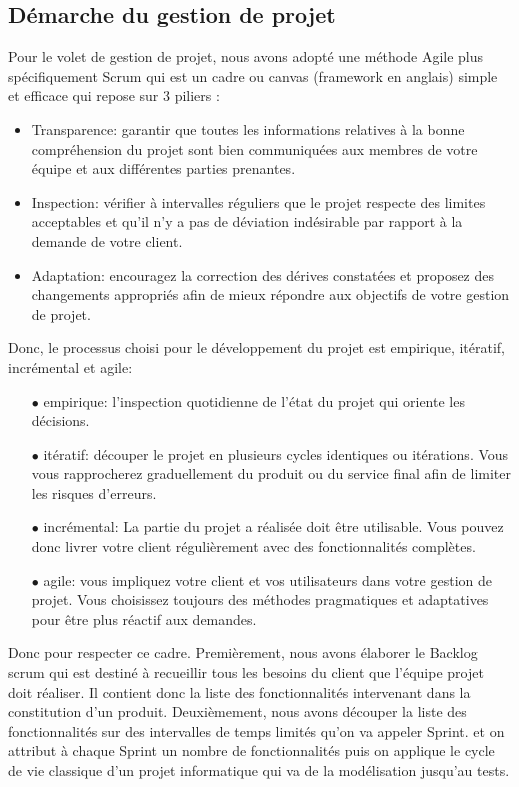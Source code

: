 \subsection{Démarche du gestion de projet} %
\label{sub:démarche_du_gestion_de_projet}
Pour le volet de gestion de projet, nous avons adopté une méthode Agile plus spécifiquement Scrum qui est un cadre ou canvas (framework en anglais) simple et efficace qui repose sur 3 piliers :
\begin{itemize}
	\item Transparence: garantir que toutes les informations relatives à la bonne compréhension du projet sont bien communiquées aux membres de votre équipe et aux différentes parties prenantes.
	\item Inspection: vérifier à intervalles réguliers que le projet respecte des limites acceptables et qu’il n’y a pas de déviation indésirable par rapport à la demande de votre client.
	\item Adaptation: encouragez la correction des dérives constatées et proposez des changements appropriés afin de mieux répondre aux objectifs de votre gestion de projet.
\end{itemize}
Donc, le processus choisi pour le développement du projet est empirique, itératif, incrémental et agile: 
\begin{itemize}
	\item[$\bullet$] empirique: l'inspection quotidienne de l'état du projet qui oriente les décisions.
	\item[$\bullet$] itératif: découper le projet en plusieurs cycles identiques ou itérations. Vous vous rapprocherez graduellement du produit ou du service final afin de limiter les risques d'erreurs.
	\item[$\bullet$] incrémental: La partie du projet a réalisée doit être utilisable. Vous pouvez donc livrer votre client régulièrement avec des fonctionnalités complètes.
	\item[$\bullet$] agile: vous impliquez votre client et vos utilisateurs dans votre gestion de projet. Vous choisissez toujours des méthodes pragmatiques et adaptatives pour être plus réactif aux demandes.
\end{itemize}
Donc pour respecter ce cadre. Premièrement, nous avons élaborer le Backlog scrum qui est destiné à recueillir tous les besoins du client que l'équipe projet doit réaliser. Il contient donc la liste des fonctionnalités intervenant dans la constitution d'un produit.
Deuxièmement, nous avons découper la liste des fonctionnalités sur des intervalles de temps limités qu'on va appeler Sprint. et on attribut à chaque Sprint un nombre de fonctionnalités puis on applique le cycle de vie classique d'un projet informatique qui va de la modélisation jusqu'au tests.\newline
{}

